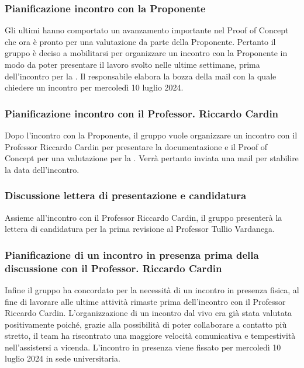 \subsubsection{Pianificazione incontro con la Proponente}
\par Gli ultimi  hanno comportato un avanzamento importante nel Proof of Concept che ora è pronto per una valutazione da parte della Proponente. 
Pertanto il gruppo è deciso a mobilitarsi per organizzare un incontro con la Proponente in modo da poter presentare il lavoro svolto nelle ultime settimane, prima dell'incontro per la \RTB. 
Il responsabile elabora la bozza della mail con la quale chiedere un incontro per mercoledì 10 luglio 2024.

\subsubsection{Pianificazione incontro con il Professor. Riccardo Cardin}
\par Dopo l'incontro con la Proponente, il gruppo vuole organizzare un incontro con il Professor Riccardo Cardin per presentare la documentazione e il Proof of Concept per una valutazione per la \RTB. Verrà pertanto inviata una mail per stabilire la data dell'incontro.

\subsubsection{Discussione lettera di presentazione e candidatura \RTB}
\par Assieme all'incontro con il Professor Riccardo Cardin, il gruppo presenterà la lettera di candidatura per la prima revisione \RTB al Professor Tullio Vardanega.

\subsubsection{Pianificazione di un incontro in presenza prima della discussione con il Professor. Riccardo Cardin}
\par Infine il gruppo ha concordato per la necessità di un incontro in presenza fisica, al fine di lavorare alle ultime attività rimaste prima dell'incontro con il Professor Riccardo Cardin. L'organizzazione di un incontro dal vivo era già stata valutata positivamente poiché, grazie alla possibilità di poter collaborare a contatto più stretto, il team ha riscontrato una maggiore velocità comunicativa e tempestività nell'assistersi a vicenda.
L'incontro in presenza viene fissato per mercoledì 10 luglio 2024 in sede universitaria.